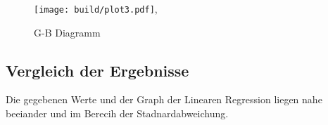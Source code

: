 \begin{figure}
    \centering
    \texttt{[image: build/plot3.pdf]},
   \caption{G-B Diagramm}
   \label{fig:G-BL}
\end{figure}
\newpage
\subsection{Vergleich der Ergebnisse}
Die gegebenen Werte und der Graph der Linearen Regression liegen nahe beeiander und im Berecih der Stadnardabweichung. 